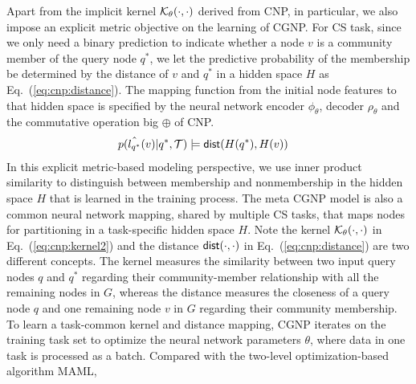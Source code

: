 Apart from the implicit kernel $\mathcal{K}_\theta(\cdot, \cdot)$ derived from CNP, in particular, we also impose an explicit metric objective on the learning of CGNP. 
For CS task, since we only need a binary prediction to indicate whether a node $v$ is a community member of the query node $q^*$, we let the predictive probability of the membership be determined by the distance of $v$ and $q^*$ in a hidden space $H$ as Eq.~(\ref{eq:cnp:distance}). 
The mapping function from the initial node features to that hidden space is specified by the neural network encoder $\phi_\theta$, decoder $\rho_\theta$ and the commutative operation big $\oplus$ of CNP.
%
\begin{align}
\label{eq:cnp:distance}
p(\hat{l_{q^*}}(v) | q^*, \mathcal{T}) &\models {\ensuremath {\mathsf{dist}}}( H(q^*), H(v)) 
\end{align}
In this explicit metric-based modeling perspective, we use inner product similarity to distinguish between membership and nonmembership in the hidden space $H$ that is learned in the training process.
The meta CGNP model is also a common neural network mapping, shared by multiple CS tasks, that maps nodes for partitioning in a task-specific hidden space $H$.
Note the kernel $\mathcal{K}_\theta(\cdot,\cdot)$ in Eq.~(\ref{eq:cnp:kernel2}) and the distance ${\mathsf{dist}}(\cdot, \cdot)$ in Eq.~(\ref{eq:cnp:distance}) are two different concepts. 
The kernel measures the similarity between two input query nodes $q$ and $q^*$ regarding their community-member relationship with all the remaining nodes in $G$, whereas the distance measures the closeness of a query node $q$ and one remaining node $v$ in $G$ regarding their community membership.  
To learn a task-common kernel and distance mapping, CGNP iterates on the training task set to optimize the neural network parameters $\theta$, where data in one task is processed as a batch.
Compared with the two-level optimization-based algorithm MAML, %
